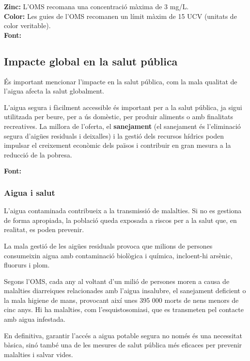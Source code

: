 \textbf{Zinc:} L’OMS recomana una concentració màxima de 3 mg/L.\\

\textbf{Color:} Les guies de l’OMS recomanen un límit màxim de 15 UCV (unitats de color veritable).\\

\textbf{Font:}~\cite{Estan}
\subsection{Impacte global en la salut pública}
És important mencionar l'impacte en la salut pública, com la mala qualitat de l'aigua afecta la salut globalment.


L'aigua segura i fàcilment accessible és important per a la salut pública, ja sigui utilitzada per beure, per a ús domèstic, per produir aliments o amb finalitats recreatives. La millora de l'oferta, el \textbf{sanejament} (el sanejament és l’eliminació segura d’aigües residuals i deixalles) i la gestió dels recursos hídrics poden impulsar el creixement econòmic dels països i contribuir en gran mesura a la reducció de la pobresa.

\textbf{Font:}~\cite{OrgaMS}

\subsubsection{Aigua i salut}
L’aigua contaminada contribueix a la transmissió de malalties.
Si no es gestiona de forma apropiada, la població queda exposada a riscos per a la salut que, en realitat, es poden prevenir.

La mala gestió de les aigües residuals provoca que milions de persones consumeixin aigua amb contaminació biològica i química, incloent-hi arsènic, fluorurs i plom.

Segons l’OMS, cada any al voltant d’un milió de persones moren a causa de malalties diarreiques relacionades amb l’aigua insalubre, el sanejament deficient o la mala higiene de mans, provocant així unes 395 000 morts de nens menors de cinc anys. Hi ha malalties, com l’esquistosomiasi, que es transmeten pel contacte amb aigua infestada.

En definitiva, garantir l’accés a aigua potable segura no només és una necessitat bàsica, sinó també una de les mesures de salut pública més eficaces per prevenir malalties i salvar vides.

